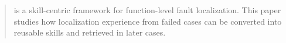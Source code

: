 \begin{abstract}
\toolname{} is a skill-centric framework for function-level fault localization.
This paper studies how localization experience from failed cases can be converted into reusable skills and retrieved in later cases.
\end{abstract}
